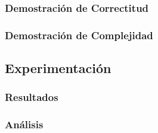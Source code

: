 \documentclass[spanish,12pt]{article}
\begin{document}
\subsubsection{Demostración de Correctitud}

\subsubsection{Demostración de Complejidad}

\subsection{Experimentación}

\subsubsection{Resultados}

\subsubsection{Análisis}
\end{document}
